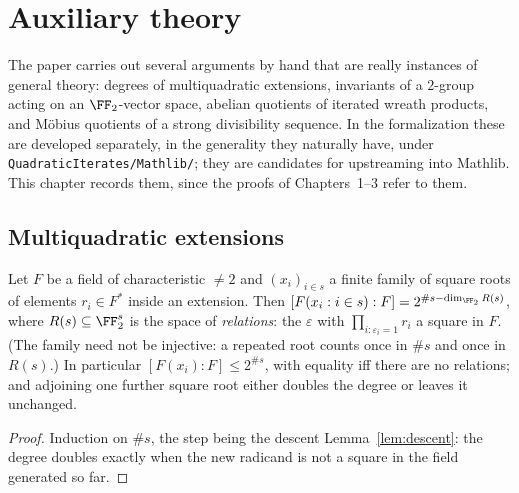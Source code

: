 \chapter{Auxiliary theory}

The paper carries out several arguments by hand that are really instances of general theory:
degrees of multiquadratic extensions, invariants of a $2$-group acting on an $\FF_2$-vector
space, abelian quotients of iterated wreath products, and Möbius quotients of a strong
divisibility sequence. In the formalization these are developed separately, in the generality
they naturally have, under \texttt{QuadraticIterates/Mathlib/}; they are candidates for
upstreaming into Mathlib. This chapter records them, since the proofs of Chapters~1--3 refer to
them.

\section{Multiquadratic extensions}

\begin{lemma}
  \label{lem:multiquadratic}
  \leanok
  Let $F$ be a field of characteristic $\ne 2$ and $(x_i)_{i \in s}$ a finite family of square
  roots of elements $r_i \in F^*$ inside an extension. Then
  $[F(x_i : i \in s) : F] = 2^{\#s - \dim_{\FF_2} R(s)}$, where $R(s) \subseteq \FF_2^{s}$ is the
  space of \emph{relations}: the $\varepsilon$ with $\prod_{i : \varepsilon_i = 1} r_i$ a square in
  $F$. (The family need not be injective: a repeated root counts once in $\#s$ and once in
  $R(s)$.) In particular $[F(x_i) : F] \le 2^{\#s}$, with equality iff there are no relations; and
  adjoining one further square root either doubles the degree or leaves it unchanged.
\end{lemma}
\begin{proof}
  \leanok
  Induction on $\#s$, the step being the descent Lemma~\ref{lem:descent}: the degree doubles
  exactly when the new radicand is not a square in the field generated so far.
\end{proof}

